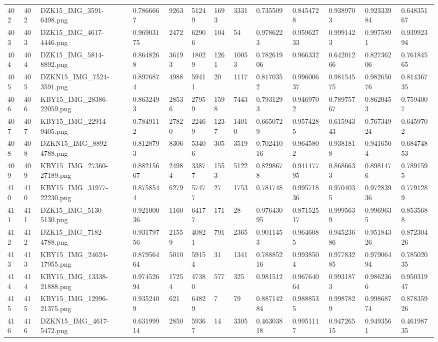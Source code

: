 \documentclass[11pt, a4paper, twoside]{report}
\begin{document}
\begin{longtable}[c]{@{}lllllllllllll@{}}
402 & 402 & DZK15\_IMG\_3591-6498.png & 0.7866667 & 9263 & 51249 & 1693 & 3331 & 0.735509 & 0.8454728 & 0.9389703 & 0.92333984 & 0.64835167 \\
403 & 403 & DZK15\_IMG\_4617-4446.png & 0.96903175 & 2472 & 62906 & 104 & 54 & 0.9786223 & 0.95962733 & 0.9991423 & 0.9975891 & 0.93992394 \\
404 & 404 & DZK15\_IMG\_5814-8892.png & 0.8648268 & 36193 & 18029 & 1261 & 10053 & 0.78261906 & 0.966332 & 0.64201266 & 0.82736206 & 0.76184565 \\
405 & 405 & DZKN15\_IMG\_7524-3591.png & 0.8976874 & 4988 & 59411 & 20 & 1117 & 0.8170352 & 0.99600637 & 0.98154575 & 0.98265076 & 0.81436735 \\
406 & 406 & KBY15\_IMG\_28386-22059.png & 0.8632493 & 28536 & 27959 & 1598 & 7443 & 0.7931293 & 0.9469702 & 0.78975767 & 0.8620453 & 0.7594007 \\
407 & 407 & KBY15\_IMG\_22914-9405.png & 0.7849112 & 27820 & 22469 & 1237 & 14010 & 0.6650729 & 0.9574285 & 0.61594343 & 0.76734924 & 0.6459702 \\
408 & 408 & DZKN15\_IMG\_8892-4788.png & 0.8128793 & 8306 & 53406 & 305 & 3519 & 0.70241016 & 0.9645802 & 0.9381818 & 0.9416504 & 0.68474853 \\
409 & 409 & KBY15\_IMG\_27360-27189.png & 0.88215667 & 24984 & 33877 & 1553 & 5122 & 0.8298678 & 0.94147795 & 0.8686633 & 0.8981476 & 0.7891595 \\
410 & 410 & KBY15\_IMG\_31977-22230.png & 0.8758544 & 6279 & 57477 & 27 & 1753 & 0.781748 & 0.99571836 & 0.9704035 & 0.97283936 & 0.7791289 \\
411 & 411 & DZK15\_IMG\_5130-5130.png & 0.92100036 & 1160 & 64177 & 171 & 28 & 0.97643095 & 0.87152517 & 0.9995639 & 0.9969635 & 0.8535688 \\
412 & 412 & DZK15\_IMG\_7182-4788.png & 0.93179756 & 21559 & 40821 & 791 & 2365 & 0.9011453 & 0.9646085 & 0.94523686 & 0.95184326 & 0.87230426 \\
413 & 413 & KBY15\_IMG\_24624-17955.png & 0.87956464 & 5010 & 59154 & 31 & 1341 & 0.78885216 & 0.9938504 & 0.97783285 & 0.97906494 & 0.78502035 \\
414 & 414 & KBY15\_IMG\_13338-21888.png & 0.97452694 & 17254 & 47380 & 577 & 325 & 0.981512 & 0.96764064 & 0.9931873 & 0.9862366 & 0.95031947 \\
415 & 415 & KBY15\_IMG\_12996-21375.png & 0.9352409 & 621 & 64829 & 7 & 79 & 0.88714284 & 0.9888535 & 0.9987829 & 0.99868774 & 0.87835926 \\
416 & 416 & DZKN15\_IMG\_4617-5472.png & 0.63199914 & 2850 & 59367 & 14 & 3305 & 0.46303818 & 0.9951117 & 0.94726515 & 0.9493561 & 0.46198735 \\

\end{longtable}
\end{document}
